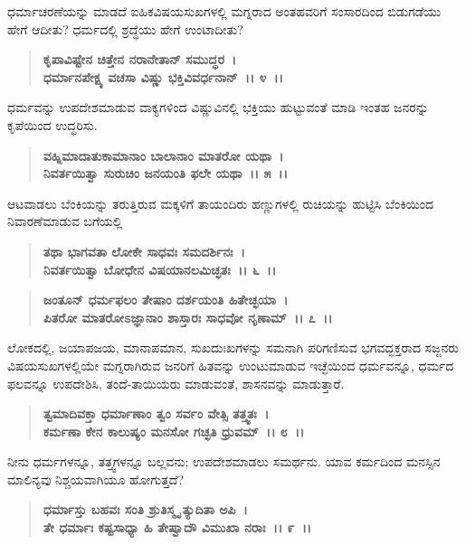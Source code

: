ಧರ್ಮಾಚರಣೆಯನ್ನು ಮಾಡದೆ ಐಹಿಕವಿಷಯಸುಖಗಳಲ್ಲಿ ಮಗ್ನರಾದ ಅಂತಹವರಿಗೆ ಸಂಸಾರದಿಂದ ಬಿಡುಗಡೆಯು ಹೇಗೆ ಆದೀತು? ಧರ್ಮದಲ್ಲಿ ಶ್ರದ್ಧೆಯು ಹೇಗೆ ಉಂಟಾದೀತು?

\begin{verse}
\textbf{ಕೃಪಾವಿಷ್ಟೇನ ಚಿತ್ತೇನ ನರಾನೇತಾನ್ ಸಮುದ್ಧರ~।}\\\textbf{ಧರ್ಮಾನಪೇಕ್ಷ್ಯ ವಚಸಾ ವಿಷ್ಣು ಭಕ್ತಿವಿವರ್ಧನಾನ್~।। ೪~।।}
\end{verse}

ಧರ್ಮವನ್ನು ಉಪದೇಶಮಾಡುವ ವಾಕ್ಯಗಳಿಂದ ವಿಷ್ಣುವಿನಲ್ಲಿ ಭಕ್ತಿಯು ಹುಟ್ಟುವಂತೆ ಮಾಡಿ ಇಂತಹ ಜನರನ್ನು ಕೃಪೆಯಿಂದ ಉದ್ಧರಿಸು.

\begin{verse}
\textbf{ವಹ್ನಿಮಾದಾತುಕಾಮಾನಾಂ ಬಾಲಾನಾಂ ಮಾತರೋ ಯಥಾ~।}\\\textbf{ನಿವರ್ತಯಿತ್ವಾ ಸುರುಚಿಂ ಜನಯಂತಿ ಫಲೇ ಯಥಾ~।। ೫~।।}
\end{verse}

ಆಟವಾಡಲು ಬೆಂಕಿಯನ್ನು ತರುತ್ತಿರುವ ಮಕ್ಕಳಿಗೆ ತಾಯಂದಿರು ಹಣ್ಣುಗಳಲ್ಲಿ ರುಚಿಯನ್ನು ಹುಟ್ಟಿಸಿ ಬೆಂಕಿಯಿಂದ ನಿವಾರಣೆಮಾಡುವ ಬಗೆಯಲ್ಲಿ

\begin{verse}
\textbf{ತಥಾ ಭಾಗವತಾ ಲೋಕೇ ಸಾಧವಃ ಸಮದರ್ಶಿನಃ~।}\\\textbf{ನಿವರ್ತಯಿತ್ವಾ ಬೋಧೇನ ವಿಷಯಾನಲಮಿಚ್ಛತಃ~।। ೬~।।}
\end{verse}

\begin{verse}
\textbf{ಜಂತೂನ್ ಧರ್ಮಫಲಂ ತೇಷಾಂ ದರ್ಶಯಂತಿ ಹಿತೇಚ್ಛಯಾ~।}\\\textbf{ಪಿತರೋ ಮಾತರೋಽಜ್ಞಾನಾಂ ಶಾಸ್ತಾರಃ ಸಾಧವೋ ನೃಣಾಮ್~।। ೭~।।}
\end{verse}

ಲೋಕದಲ್ಲಿ, ಜಯಾಪಜಯ, ಮಾನಾಪಮಾನ, ಸುಖದುಃಖಗಳನ್ನು ಸಮನಾಗಿ ಪರಿಗಣಿಸುವ ಭಗವದ್ಭಕ್ತರಾದ ಸಜ್ಜನರು ವಿಷಯಸುಖಗಳಲ್ಲಿಯೇ ಮಗ್ನರಾಗಿರುವ ಜನರಿಗೆ ಹಿತವನ್ನು ಉಂಟುಮಾಡುವ ಇಚ್ಛೆಯಿಂದ ಧರ್ಮವನ್ನೂ, ಧರ್ಮದ ಫಲವನ್ನೂ ಉಪದೇಶಿಸಿ, ತಂದೆ-ತಾಯಿಯರು ಮಾಡುವಂತೆ, ಶಾಸನವನ್ನು ಮಾಡುತ್ತಾರೆ.

\begin{verse}
\textbf{ತ್ವಮಾದಿವಕ್ತಾ ಧರ್ಮಾಣಾಂ ತ್ವಂ ಸರ್ವಂ ವೇತ್ಸಿ ತತ್ತ್ವತಃ~।}\\\textbf{ಕರ್ಮಣಾ ಕೇನ ಕಾಲುಷ್ಯಂ ಮನಸೋ ಗಚ್ಛತಿ ಧ್ರುವಮ್~।। ೮~।।}
\end{verse}

ನೀನು ಧರ್ಮಗಳನ್ನೂ, ತತ್ತ್ವಗಳನ್ನೂ ಬಲ್ಲವನು; ಉಪದೇಶಮಾಡಲು ಸಮರ್ಥನು. ಯಾವ ಕರ್ಮದಿಂದ ಮನಸ್ಸಿನ ಮಾಲಿನ್ಯವು ನಿಶ್ಚಯವಾಗಿಯೂ ಹೋಗುತ್ತದೆ?

\begin{verse}
\textbf{ಧರ್ಮಾಸ್ತು ಬಹವಃ ಸಂತಿ ಶ್ರುತಿಸ್ಮೃ ತ್ಯುದಿತಾ ಅಪಿ~।}\\\textbf{ತೇ ಧರ್ಮಾಃ ಕಷ್ಟಸಾಧ್ಯಾ ಹಿ ತೇಷ್ವಾದೌ ವಿಮುಖಾ ನರಾಃ~।। ೯~।।}
\end{verse}

